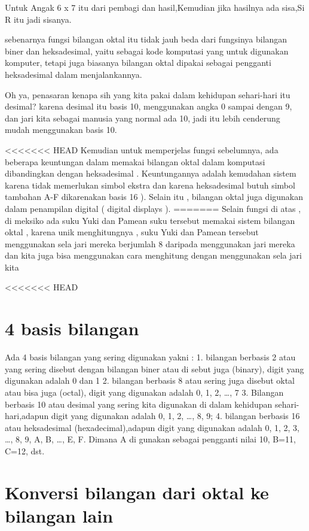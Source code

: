 Untuk Angak 6 x 7 itu dari pembagi dan hasil,Kemudian jika hasilnya ada sisa,Si R itu jadi sisanya.


sebenarnya fungsi bilangan oktal itu tidak jauh beda dari fungsinya bilangan biner dan heksadesimal, yaitu sebagai kode komputasi yang untuk digunakan komputer, tetapi juga biasanya bilangan oktal dipakai sebagai pengganti heksadesimal dalam menjalankannya.

Oh ya, penasaran kenapa sih yang kita pakai dalam kehidupan sehari-hari itu desimal? karena desimal itu basis 10, menggunakan angka 0 sampai dengan 9, dan jari kita sebagai manusia yang normal ada 10, jadi itu lebih cenderung  mudah menggunakan basis 10.

<<<<<<< HEAD
Kemudian  untuk memperjelas fungsi sebelumnya, ada beberapa keuntungan dalam memakai bilangan oktal dalam komputasi dibandingkan dengan heksadesimal . Keuntungannya adalah kemudahan sistem karena tidak memerlukan simbol ekstra dan karena heksadesimal butuh simbol tambahan A-F dikarenakan basis 16 ). Selain itu , bilangan oktal juga digunakan dalam penampilan digital ( digital displays ).
=======
Selain fungsi di atas  , di meksiko ada suku Yuki dan Pamean suku tersebut memakai sistem bilangan oktal , karena unik menghitungnya , suku Yuki dan Pamean tersebut menggunakan sela jari mereka berjumlah 8 daripada menggunakan jari mereka dan kita juga bisa menggunakan cara menghitung dengan menggunakan sela jari kita 

<<<<<<< HEAD
\section{4 basis bilangan }

Ada 4 basis bilangan yang sering digunakan yakni :
1. bilangan berbasis 2 atau yang sering disebut dengan bilangan biner atau di sebut juga (binary), digit yang digunakan adalah 0 dan 1
2. bilangan berbasis 8 atau sering juga disebut oktal atau bisa juga (octal), digit yang digunakan adalah 0, 1, 2, …, 7
3. Bilangan berbasis 10 atau desimal yang sering kita digunakan di dalam kehidupan sehari-hari,adapun digit yang digunakan adalah 0, 1, 2, …, 8, 9; 
4. bilangan berbasis 16 atau heksadesimal (hexadecimal),adapun digit yang digunakan adalah 0, 1, 2, 3, …, 8, 9, A, B, …, E, F. Dimana A di gunakan sebagai pengganti nilai 10, B=11, C=12, dst.

\section{Konversi bilangan dari oktal ke bilangan lain}
